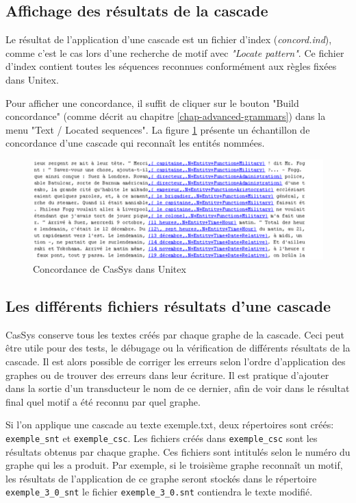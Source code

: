 \subsection{Affichage des résultats de la cascade}
\label{subsec:resultsCascade}

Le résultat de l'application d'une cascade est un fichier d'index (\textit{concord.ind}), comme c'est le cas
lors d'une recherche de motif avec \textit{"Locate pattern"}. Ce fichier d'index contient toutes les séquences
reconnues conformément aux règles fixées dans Unitex.

\bigskip
\noindent Pour afficher une concordance, il suffit de cliquer sur le bouton "Build concordance"
(comme décrit au chapitre \ref{chap-advanced-grammars}) dans la menu "Text / Located sequences".
La figure \ref{fig13-04} présente un échantillon de concordance d'une cascade qui reconnaît les entités
nommées.


\begin{figure}[!htb]
  \centering
  \includegraphics[width=14cm]{resources/img/fig13-04.png}
  \caption{Concordance de CasSys dans Unitex}
  \label{fig13-04}
\end{figure}

\subsection{Les différents fichiers résultats d'une cascade}

CasSys conserve tous les textes créés par chaque graphe  de la cascade. Ceci peut être
utile  pour des tests, le débugage ou la vérification de différents résultats de la cascade. Il est
alors possible de corriger les erreurs selon l'ordre d'application des graphes ou de trouver des
erreurs dans leur écriture. Il est pratique d'ajouter dans la sortie d'un transducteur le nom de ce
dernier, afin de voir dans le résultat final quel motif a été reconnu par quel graphe.

Si l'on applique une cascade au texte exemple.txt, deux répertoires sont créés:
\verb+exemple_snt+ et \verb+exemple_csc+.
Les fichiers créés dans \verb+exemple_csc+ sont les résultats obtenus par
chaque graphe. Ces fichiers sont intitulés selon le numéro du graphe qui les a produit. Par exemple, si le
troisième graphe reconnaît un motif, les résultats de l'application de ce graphe seront stockés dans le 
répertoire  \verb+exemple_3+\newline\verb+_0_snt+ le fichier \verb+exemple_3_0.snt+ contiendra le texte modifié.

